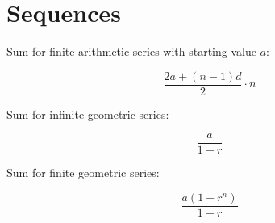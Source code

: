 \section{Sequences}

Sum for finite arithmetic series with starting value $a$:

\begin{equation}
    \frac{2a+(n-1)d}{2}\cdot n
\end{equation}

Sum for infinite geometric series:

\begin{equation}
    \frac{a}{1-r}
\end{equation}

Sum for finite geometric series:

\begin{equation}
    \frac{a(1-r^n)}{1-r}
\end{equation}
